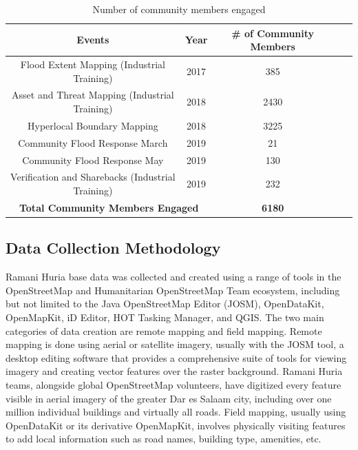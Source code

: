 \documentclass[a4paper,12pt,twoside]{article}
\begin{document}
\begin{table}[h]
\begin{tabular}{|c|c|c|c|c|}
	\hline
\bfseries Events & \bfseries Year & \bfseries \# of Community Members\\
	\hline
	Flood Extent Mapping (Industrial Training) & 2017 & 385\\
	\hline
	Asset and Threat Mapping (Industrial Training) & 2018 & 2430\\
	\hline
	Hyperlocal Boundary Mapping & 2018 & 3225\\
	\hline
	Community Flood Response March & 2019 & 21\\
	\hline
	Community Flood Response May & 2019 & 130\\
	\hline
	Verification and Sharebacks (Industrial Training) & 2019 & 232\\
	\hline	
\multicolumn{2}{|c|}{\bfseries Total Community Members Engaged} & \bfseries 6180 \\
\hline
\end{tabular}
\caption{\label{tab:table-name}Number of community members engaged}
\end{table}

\newpage
\subsection{Data Collection Methodology}
\begin{multicols}{2}
Ramani Huria base data was collected and created using a range of tools in the OpenStreetMap and Humanitarian OpenStreetMap Team ecosystem, including but not limited to the Java OpenStreetMap Editor (JOSM), OpenDataKit, OpenMapKit, iD Editor, HOT Tasking Manager, and QGIS. 
The two main categories of data creation are remote mapping and field mapping. Remote mapping is done using aerial or satellite imagery, usually with the JOSM tool, a desktop editing software that provides a comprehensive suite of tools for viewing imagery and creating vector features over the raster background. Ramani Huria teams, alongside global OpenStreetMap volunteers, have digitized every feature visible in aerial imagery of the greater Dar es Salaam city, including over one million individual buildings and virtually all roads.
Field mapping, usually using OpenDataKit or its derivative OpenMapKit, involves physically visiting features to add local information such as road names, building type, amenities, etc.
\end{multicols}
\end{document}
